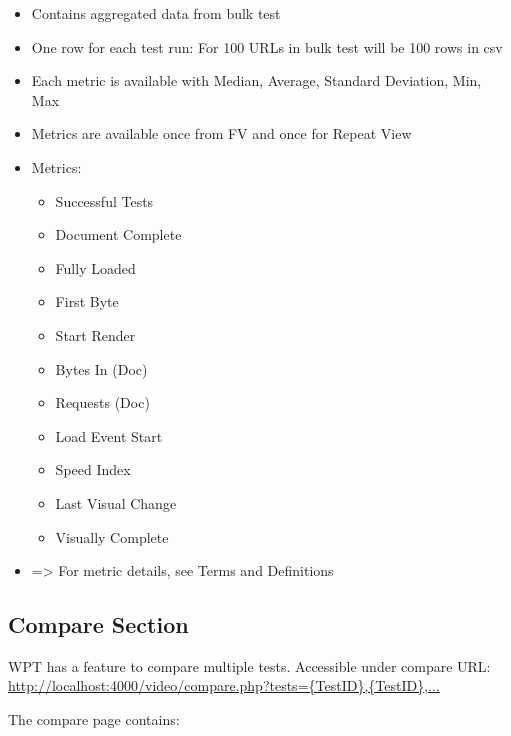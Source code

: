 \begin{itemize}
\item Contains aggregated data from bulk test
\item One row for each test run: For 100 URLs in bulk test will be 100 rows in csv
\item Each metric is available with Median, Average, Standard Deviation, Min, Max
\item Metrics are available once from FV and once for Repeat View
\item Metrics:
	\begin{itemize}
	\item Successful Tests
	\item Document Complete
	\item Fully Loaded
	\item First Byte
	\item Start Render
	\item Bytes In (Doc)
	\item Requests (Doc)
	\item Load Event Start
	\item Speed Index
	\item Last Visual Change
	\item Visually Complete
	\end{itemize}
\item => For metric details, see Terms and Definitions
\end{itemize}


\subsection{Compare Section}

WPT has a feature to compare multiple tests.
Accessible under compare URL: \url{http://localhost:4000/video/compare.php?tests={TestID},{TestID},...}

The compare page contains:

